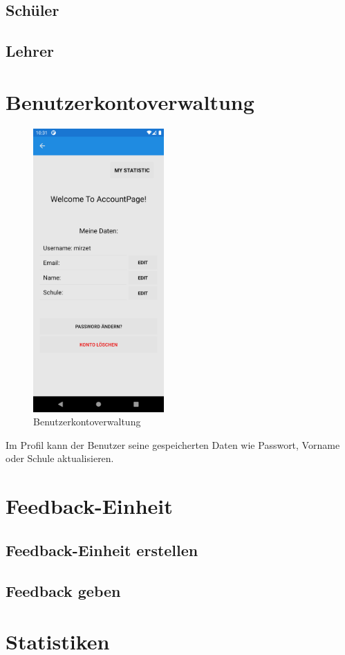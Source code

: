 \subsection{Schüler}
\subsection{Lehrer}
\newpage

\section{Benutzerkontoverwaltung}
\begin{figure}[h]
    \begin{center}
        \includegraphics*[width=5cm]{pics/My Account.png}
        \caption[Benutzerkontoverwaltung]{Benutzerkontoverwaltung}
    \end{center}
\end{figure}
Im Profil kann der Benutzer seine gespeicherten Daten wie Passwort, Vorname oder
Schule aktualisieren.

\section{Feedback-Einheit}
\subsection{Feedback-Einheit erstellen}
\subsection{Feedback geben}

\section{Statistiken}
